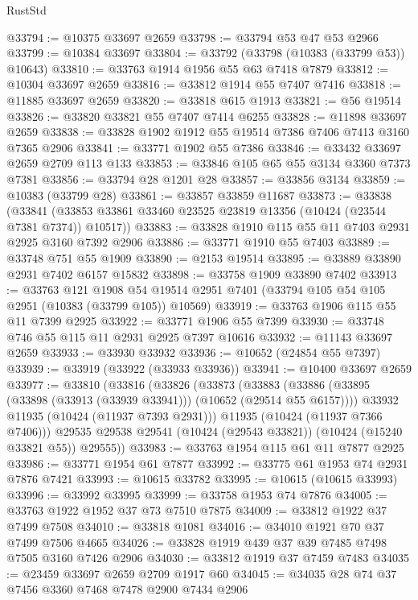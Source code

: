 \begin{lexlean}{RustStd}
\begin{coremodule}
@33794 := @10375 @33697 @2659
@33798 := @33794 @53 @47 @53 @2966
@33799 := @10384 @33697
@33804 := @33792 (@33798 (@10383 (@33799 @53)) @10643)
@33810 := @33763 @1914 @1956 @55 @63 @7418 @7879
@33812 := @10304 @33697 @2659
@33816 := @33812 @1914 @55 @7407 @7416
@33818 := @11885 @33697 @2659
@33820 := @33818 @615 @1913
@33821 := @56 @19514
@33826 := @33820 @33821 @55 @7407 @7414 @6255
@33828 := @11898 @33697 @2659
@33838 := @33828 @1902 @1912 @55 @19514 @7386 @7406 @7413 @3160 @7365 @2906
@33841 := @33771 @1902 @55 @7386
@33846 := @33432 @33697 @2659 @2709 @113 @133
@33853 := @33846 @105 @65 @55 @3134 @3360 @7373 @7381
@33856 := @33794 @28 @1201 @28
@33857 := @33856 @3134
@33859 := @10383 (@33799 @28)
@33861 := @33857 @33859 @11687
@33873 := @33838
    (@33841 (@33853 @33861 @33460 @23525 @23819 @13356 (@10424 (@23544 @7381 @7374)) @10517))
@33883 := @33828 @1910 @115 @55 @11 @7403 @2931 @2925 @3160 @7392 @2906
@33886 := @33771 @1910 @55 @7403
@33889 := @33748 @751 @55 @1909
@33890 := @2153 @19514
@33895 := @33889 @33890 @2931 @7402 @6157 @15832
@33898 := @33758 @1909 @33890 @7402
@33913 := @33763
    @121
    @1908
    @54
    @19514
    @2951
    @7401
    (@33794 @105 @54 @105 @2951 (@10383 (@33799 @105)) @10569)
@33919 := @33763 @1906 @115 @55 @11 @7399 @2925
@33922 := @33771 @1906 @55 @7399
@33930 := @33748 @746 @55 @115 @11 @2931 @2925 @7397 @10616
@33932 := @11143 @33697 @2659
@33933 := @33930 @33932
@33936 := @10652 (@24854 @55 @7397)
@33939 := @33919 (@33922 (@33933 @33936))
@33941 := @10400 @33697 @2659
@33977 := @33810
    (@33816
      (@33826
        (@33873
          (@33883
            (@33886 (@33895 (@33898 (@33913 (@33939 @33941))) (@10652 (@29514 @55 @6157))))
            @33932
            @11935
            (@10424 (@11937 @7393 @2931)))
          @11935
          (@10424 (@11937 @7366 @7406)))
        @29535
        @29538
        @29541
        (@10424 (@29543 @33821))
        (@10424 (@15240 @33821 @55))
        @29555))
@33983 := @33763 @1954 @115 @61 @11 @7877 @2925
@33986 := @33771 @1954 @61 @7877
@33992 := @33775 @61 @1953 @74 @2931 @7876 @7421
@33993 := @10615 @33782
@33995 := @10615 (@10615 @33993)
@33996 := @33992 @33995
@33999 := @33758 @1953 @74 @7876
@34005 := @33763 @1922 @1952 @37 @73 @7510 @7875
@34009 := @33812 @1922 @37 @7499 @7508
@34010 := @33818 @1081
@34016 := @34010 @1921 @70 @37 @7499 @7506 @4665
@34026 := @33828 @1919 @439 @37 @39 @7485 @7498 @7505 @3160 @7426 @2906
@34030 := @33812 @1919 @37 @7459 @7483
@34035 := @23459 @33697 @2659 @2709 @1917 @60
@34045 := @34035 @28 @74 @37 @7456 @3360 @7468 @7478 @2900 @7434 @2906

\end{coremodule}
\end{lexlean}
